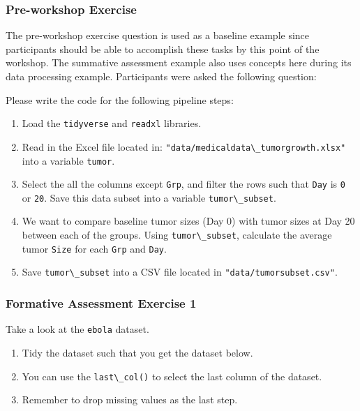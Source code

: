 \documentclass[acmsmall]{acmart}
\newcommand{\code}[1]{\lstinline{#1}}
\begin{document}
\subsubsection{Pre-workshop Exercise}

The pre-workshop exercise question is used as a baseline example since participants should
be able to accomplish these tasks by this point of the workshop.
The summative assessment example also uses concepts here during its data processing example.
Participants were asked the following question:

\begin{displayquote}
	
	Please write the code for the following pipeline steps:
	
	\begin{enumerate}
		\item Load the \code{tidyverse} and \code{readxl} libraries.
		\item Read in the Excel file located in:
		\code{"data/medicaldata\_tumorgrowth.xlsx"} into a variable \code{tumor}.
		\item Select the all the columns except \code{Grp},
		and filter the rows such that \code{Day} is \code{0} or \code{20}.
		Save this data subset into a variable \code{tumor\_subset}.
		\item We want to compare baseline tumor sizes (Day 0) with tumor sizes at Day 20 between each of the groups.
		Using \code{tumor\_subset},
		calculate the average tumor \code{Size} for each \code{Grp} and \code{Day}.
		\item Save \code{tumor\_subset} into a CSV file located in \code{"data/tumorsubset.csv"}.
	\end{enumerate}
	
\end{displayquote}

\subsubsection{Formative Assessment Exercise 1}

\begin{displayquote}
	Take a look at the \code{ebola} dataset.
	\begin{enumerate}
		\item Tidy the dataset such that you get the dataset below.
		\item You can use the \code{last\_col()} to select the last column of the dataset.
		\item Remember to drop missing values as the last step.
	\end{enumerate}
	
\end{displayquote}
\end{document}
